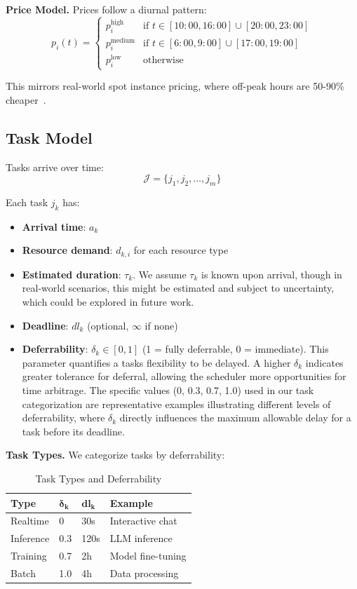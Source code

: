 \documentclass[10pt,conference]{IEEEtran}
\begin{document}
\textbf{Price Model.} Prices follow a diurnal pattern:
\begin{equation}
p_i(t) = \begin{cases}
p_i^{\text{high}} & \text{if } t \in [10:00, 16:00] \cup [20:00, 23:00] \\
p_i^{\text{medium}} & \text{if } t \in [6:00, 9:00] \cup [17:00, 19:00] \\
p_i^{\text{low}} & \text{otherwise}
\end{cases}
\end{equation}

This mirrors real-world spot instance pricing, where off-peak hours are 50-90\% cheaper~\cite{aws2025spot}.

\subsection{Task Model}

Tasks arrive over time:
\begin{equation}
\mathcal{J} = \{j_1, j_2, \ldots, j_m\}
\end{equation}

Each task $j_k$ has:
\begin{itemize}
    \item \textbf{Arrival time}: $a_k$
    \item \textbf{Resource demand}: $d_{k,i}$ for each resource type
    \item \textbf{Estimated duration}: $\tau_k$. We assume $\tau_k$ is known upon arrival, though in real-world scenarios, this might be estimated and subject to uncertainty, which could be explored in future work.
    \item \textbf{Deadline}: $dl_k$ (optional, $\infty$ if none)
    \item \textbf{Deferrability}: $\delta_k \in [0, 1]$ (1 = fully deferrable, 0 = immediate). This parameter quantifies a task\textquotesingle s flexibility to be delayed. A higher $\delta_k$ indicates greater tolerance for deferral, allowing the scheduler more opportunities for time arbitrage. The specific values (0, 0.3, 0.7, 1.0) used in our task categorization are representative examples illustrating different levels of deferrability, where $\delta_k$ directly influences the maximum allowable delay for a task before its deadline.
\end{itemize}

\textbf{Task Types.} We categorize tasks by deferrability:
\begin{table}[t]
\centering
\caption{Task Types and Deferrability}
\label{tab:tasks}
\begin{tabular}{@{}llll@{}}
\toprule
\textbf{Type} & $\boldsymbol{\delta_k}$ & $\boldsymbol{dl_k}$ & \textbf{Example} \\ \midrule
Realtime & 0 & 30s & Interactive chat \\
Inference & 0.3 & 120s & LLM inference \\
Training & 0.7 & 2h & Model fine-tuning \\
Batch & 1.0 & 4h & Data processing \\ \bottomrule
\end{tabular}
\end{table}
\end{document}
